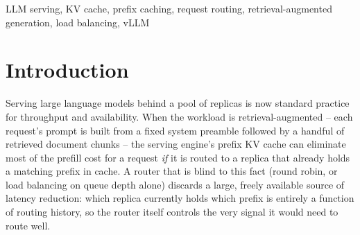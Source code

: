 \documentclass[conference]{IEEEtran}
\begin{document}
\begin{abstract}
Retrieval-augmented generation (RAG) over replicated large language
model (LLM) servers creates a joint decision: the router must select a
replica and order the retrieved chunks so that their prefix matches that
replica's KV cache. We implement this decision in an
OpenAI-compatible router for two vLLM workers and evaluate five core
strategies under calibrated cache capacity, cold starts, rotated arm
order, 800-request traces, and three repetitions. Cache-blind policies
reuse 55.5--56.2\% of prompt tokens, flat cache-aware policies reach
66.1--66.4\%, and the worker-specific joint strategy
\texttt{per\_worker\_tree} reaches $76.1\pm0.06\%$, a 9.7 percentage
point gain over \texttt{cache\_aware}. The gain grows to 12.0 points at
the highest replicated load and falls to 4.2 points on a low-locality
trace, consistent with the proposed cache-locality mechanism. Its
reported 10.7$\times$ median-TTFT advantage at that load is only a
completion-path measurement, however, and is not an end-to-end speedup.
Repeated controls do not separate \texttt{cache\_aware} from the local
DualMap-inspired prototype, nor fixed from overlap-adaptive routing; a
semantic-labelled arm is a protocol no-op at two workers. Recalibrating
tracker capacity preserves the earlier ordering ranking but eliminates
the previously reported beta-by-load/locality crossover. Dispatch-time
cache bookkeeping remains more rank-accurate under load than
completion-time bookkeeping. We report these negative replications,
prompt-serialization and raw-artifact limitations explicitly, and add
sweep tooling that records end-to-end timing, p99 latency, load
coefficient of variation, and file-backed router logs.
\end{abstract}

\begin{IEEEkeywords}
LLM serving, KV cache, prefix caching, request routing, retrieval-augmented generation, load balancing, vLLM
\end{IEEEkeywords}

\section{Introduction}

Serving large language models behind a pool of replicas is now standard
practice for throughput and availability. When the workload is
retrieval-augmented -- each request's prompt is built from a fixed
system preamble followed by a handful of retrieved document chunks --
the serving engine's prefix KV cache can eliminate most of the prefill
cost for a request \emph{if} it is routed to a replica that already
holds a matching prefix in cache. A router that is blind to this fact
(round robin, or load balancing on queue depth alone) discards a large,
freely available source of latency reduction: which replica currently
holds which prefix is entirely a function of routing history, so the
router itself controls the very signal it would need to route well.
\end{document}
